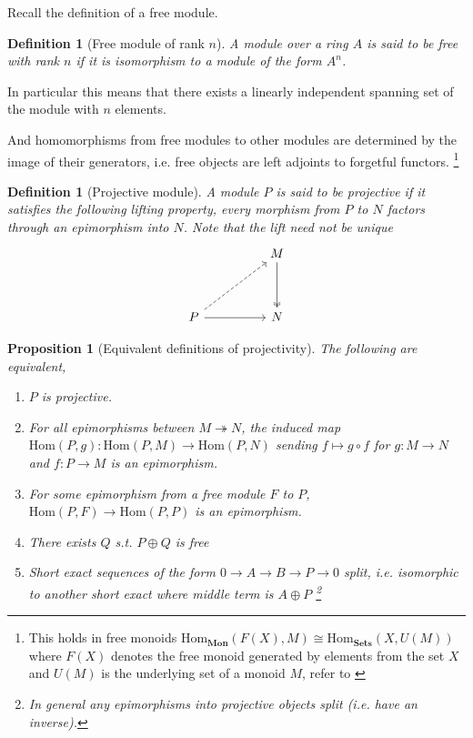 \documentclass[12pt]{report}
\numberwithin{equation}{section}
\newcommand{\Hom}{{\mathrm{Hom}}}
\newcounter{dummy} \numberwithin{dummy}{section}
\newtheorem{definition}[dummy]{Definition}
\newtheorem{proposition}[dummy]{Proposition}
\begin{document}
	Recall the definition of a free module.
	\begin{definition}[Free module of rank $n$]
	A module over a ring $A$ is said to be free with rank $n$ if it is isomorphism to a module of the form $A^n$.
	\end{definition}In particular this means that there exists a linearly independent spanning set of the module with $n$ elements.
	
	And homomorphisms from free modules to other modules are determined by the image of their generators, i.e. free objects are left adjoints to forgetful functors. \footnote{This holds in free monoids $\mathrm{Hom}_\mathbf{Mon}(F(X), M) \cong \mathrm{Hom}_\mathbf{Sets} (X, U(M))$ where $F(X)$ denotes the free monoid generated by elements from the set $X$ and $U(M)$ is the underlying set of a monoid $M$, refer to \cite[p. ~208]{Awodey} }
	\begin{definition}[Projective module]
		A module $P$ is said to be {projective} if it satisfies the following lifting property, every morphism from $P$ to $N$ factors through an epimorphism into $N$. Note that the lift need not be unique
		\[\begin{tikzcd}
			&& M \\
			\\
			P && N
			\arrow[two heads, from=1-3, to=3-3]
			\arrow[from=3-1, to=3-3]
			\arrow[dashed, from=3-1, to=1-3]
		\end{tikzcd}\]
	\end{definition}
	
	
	
	
	\begin{proposition}[Equivalent definitions of projectivity]\label{projtfae}
		The following are equivalent,
		\begin{enumerate}
			\item $P$ is projective.
			\item For all epimorphisms between $M\twoheadrightarrow N$, the induced map $\Hom(P,g):\mathrm{Hom}(P,M) \to \mathrm{Hom}(P,N)$ sending $f \mapsto g \circ f$ for $g:M \to N$ and $f:P \to M$ is an epimorphism.
			\item For some epimorphism from a free module $F$ to $P$, $\mathrm{Hom}(P,F) \to \mathrm{Hom}(P,P)$ is an epimorphism.
			\item There exists $Q$ s.t. $P \oplus Q$ is free
			\item Short exact sequences of the form $0 \to A \to B \to P \to 0$ split, i.e. isomorphic to another short exact where middle term is $A \oplus P$ \footnote{In general any epimorphisms into projective objects split (i.e. have an inverse).}
		\end{enumerate}
	\end{proposition}
	
\end{document}
